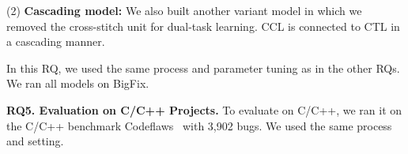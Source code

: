 
(2) \textbf{Cascading model:} We also built another variant model in
which we removed the cross-stitch unit for dual-task learning. CCL is
connected to CTL in a cascading manner.



In this RQ, we used the same process and parameter tuning as in the
other RQs. We ran all models on BigFix.



{\bf RQ5. Evaluation on C/C++ Projects.}  To evaluate {\tool} on
C/C++, we ran it on the C/C++ benchmark
Codeflaws~\cite{tan2017codeflaws} with 3,902 bugs.  We used the same
process and setting.
